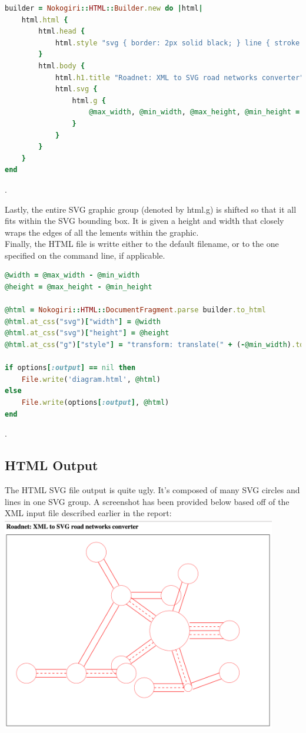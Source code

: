 \documentclass{article}
\begin{document}
\begin{lstlisting}[language=ruby]
builder = Nokogiri::HTML::Builder.new do |html|
	html.html {
		html.head {
			html.style "svg { border: 2px solid black; } line { stroke: rgb(255,0,0); stroke-width:2 } .dashed { stroke-dasharray: 10, 10 }"
		}
		html.body {
			html.h1.title "Roadnet: XML to SVG road networks converter"
			html.svg {
				html.g {
					@max_width, @min_width, @max_height, @min_height = draw_intersection(@xml.root, html, 0, 0)
				}
			}
		}
  	}
end
\end{lstlisting}.

Lastly, the entire SVG graphic group (denoted by html.g) is shifted so that it all fits within the SVG bounding box. It is given a height and width that closely wraps the edges of all the lements within the graphic.\\

Finally, the HTML file is writte either to the default filename, or to the one specified on the command line, if applicable.\\

\begin{lstlisting}[language=ruby]
@width = @max_width - @min_width
@height = @max_height - @min_height
		
@html = Nokogiri::HTML::DocumentFragment.parse builder.to_html
@html.at_css("svg")["width"] = @width
@html.at_css("svg")["height"] = @height
@html.at_css("g")["style"] = "transform: translate(" + (-@min_width).to_s + "px, " + (-@min_height).to_s + "px)"
		
if options[:output] == nil then
	File.write('diagram.html', @html)
else
	File.write(options[:output], @html)
end
\end{lstlisting}.

\subsection{HTML Output}

The HTML SVG file output is quite ugly. It's composed of many SVG circles and lines in one SVG group. A screenshot has been provided below based off of the XML input file described earlier in the report:\\

\includegraphics[width=12cm, height=9.5cm]{roadnet.png}
\end{document}
